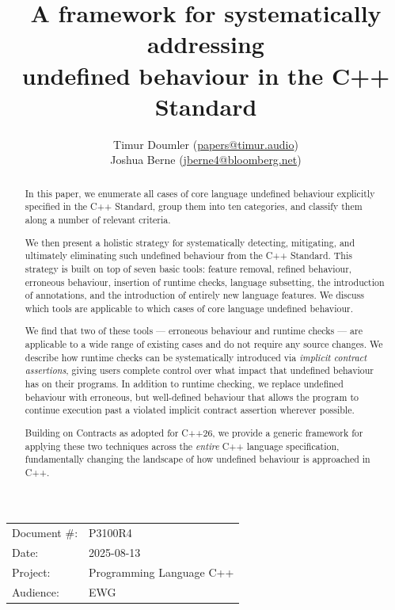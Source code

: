 

\title{A framework for systematically addressing \\ undefined behaviour in the C++ Standard} 
\author{ Timur Doumler \small(\href{mailto:papers@timur.audio}{papers@timur.audio}) 
\\ Joshua Berne \small(\href{mailto:jberne4@bloomberg.net}{jberne4@bloomberg.net})  
}
\date{}
\maketitle

\begin{tabular}{ll}
Document \#: & P3100R4 \\
Date: &2025-08-13 \\
Project: & Programming Language C++ \\
Audience: & EWG
\end{tabular}

\begin{abstract}
In this paper, we enumerate all cases of core language undefined behaviour explicitly specified in the C++ Standard,  group them into ten categories, and classify them along a number of relevant criteria.

We then present a holistic strategy for systematically detecting, mitigating, and ultimately eliminating such undefined behaviour from the C++ Standard. This strategy is built on top of seven basic tools: feature removal, refined behaviour, erroneous behaviour, insertion of runtime checks, language subsetting, the introduction of annotations, and the introduction of entirely new language features. We discuss which tools are applicable to which cases of core language undefined behaviour.

We find that two of these tools --- erroneous behaviour and runtime checks --- are applicable to a wide range of existing cases and do not require any source changes. We describe how runtime
checks can be systematically introduced via \emph{implicit contract assertions}, giving users complete
control over what impact that undefined behaviour has on their programs. In addition to runtime
checking, we replace undefined behaviour with erroneous, but well-defined behaviour that allows the program to continue execution past a violated implicit contract assertion wherever possible.

Building on Contracts as adopted for C++26, we provide a generic framework for applying these two techniques across the \emph{entire} C++ language specification, fundamentally changing the landscape of how undefined behaviour is approached in C++.
\end{abstract}

